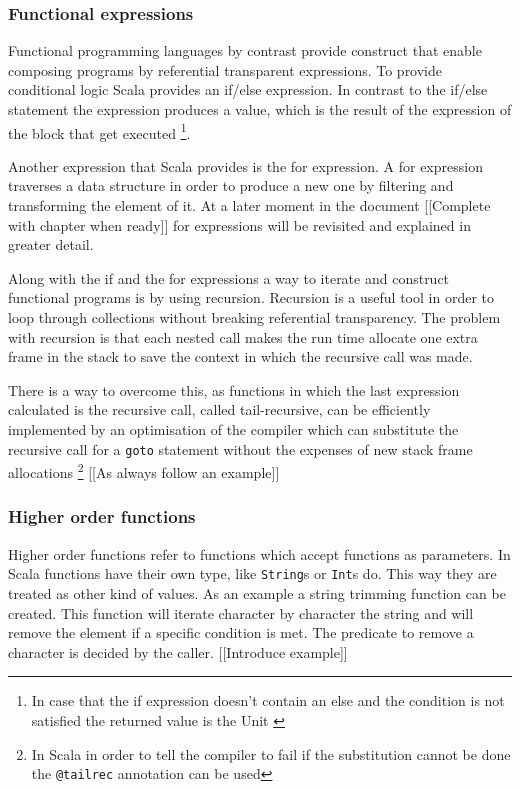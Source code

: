 \documentclass[../main.tex]{subfiles}
\begin{document}
\subsubsection{Functional expressions} Functional programming languages by
contrast provide construct that enable composing programs by referential
transparent expressions. To provide conditional logic Scala provides an if/else
expression. In contrast to the if/else statement the expression produces a
value, which is the result of the expression of the block that get executed
\footnote{In case that the if expression doesn't contain an else and the
condition is not satisfied the returned value is the Unit
\autocite{ScalaScala.Unit}}.

Another expression that Scala provides is the for expression. A for expression
traverses a data structure in order to produce a new one by filtering and
transforming the element of it. At a later moment in the document [[Complete
with chapter when ready]] for expressions will be revisited and explained in
greater detail.

Along with the if and the for expressions a way to iterate and construct
functional programs is by using recursion. Recursion is a useful tool in order
to loop through collections without breaking referential transparency. The
problem with recursion is that each nested call makes the run time allocate one
extra frame in the stack to save the context in which the recursive call was
made.

There is a way to overcome this, as functions in which the last expression
calculated is the recursive call, called tail-recursive, can be efficiently
implemented by an optimisation of the compiler which can substitute the
recursive call for a \texttt{goto} statement without the expenses of new stack
frame allocations \autocite{Steele1977DebunkingGoto} \footnote{In Scala in order
to tell the compiler to fail if the substitution cannot be done the
\texttt{@tailrec} annotation can be
used\autocite{ScalaScala.annotation.tailrec}} [[As always follow an example]]

\subsubsection{Higher order functions} Higher order functions refer to functions
which accept functions as parameters. In Scala functions have their own type,
like \texttt{String}s or \texttt{Int}s do. This way they are treated as other
kind of values. As an example a string trimming function can be created. This
function will iterate character by character the string and will remove the
element if a specific condition is met. The predicate to remove a character is
decided by the caller. [[Introduce example]]
\end{document}
